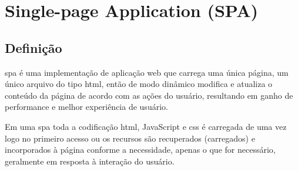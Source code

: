 \section{Single-page Application (SPA)}

\subsection{Definição}
\ac{spa} é uma implementação de aplicação web que carrega uma única página, um único arquivo do tipo \ac{html}, então de modo dinâmico modifica e atualiza o conteúdo da página de acordo com as ações do usuário, resultando em ganho de performance e melhor experiência de usuário. \cite{spamozilla}

Em uma \ac{spa} toda a codificação \ac{html}, JavaScript e \ac{css} é carregada de uma vez logo no primeiro acesso ou os recursos são recuperados (carregados) e incorporados à página conforme a necessidade, apenas o que for necessário, geralmente em resposta à interação do usuário. \cite{wikispa}